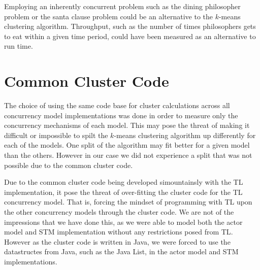 Employing an inherently concurrent problem such as the dining philosopher problem\cite[p. 673]{hoare1978communicating} or the santa clause problem\cite{trono1994new} could be an alternative to the $k$-means clustering algorithm. Throughput, such as the number of times philosophers gets to eat within a given time period, could have been measured as an alternative to run time.

\section{Common Cluster Code}
The choice of using the same code base for cluster calculations across all concurrency model implementations was done in order to measure only the concurrency mechanisms of each model. This may pose the threat of making it difficult or impossible to spilt the $k$-means clustering algorithm up differently for each of the models. One split of the algorithm may fit better for a given model than the others. However in our case we did not experience a split that was not possible due to the common cluster code. 

Due to the common cluster code being developed simountainsly with the \ac{TL} implementation, it pose the threat of over-fitting the cluster code for the \ac{TL} concurrency model. That is, forcing the mindset of programming with \ac{TL} upon the other concurrency models through the cluster code. We are not of the impressions that we have done this, as we were able to model both the actor model and \ac{STM} implementation without any restrictions posed from \ac{TL}. However as the cluster code is written in Java, we were forced to use the datastructes from Java, such as the Java List, in the actor model and \ac{STM} implementations.


\worksheetend